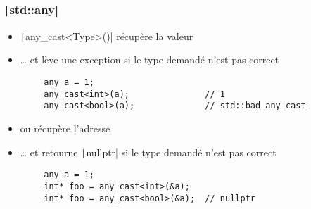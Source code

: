 \documentclass[C++.tex]{subfiles}
\begin{document}
\begin{frame}[fragile]
	\frametitle{\texttt|std::any|}
	\begin{itemize}
		\item \texttt|any_cast<Type>()| récupère la valeur
		\item \ldots{} et lève une exception si le type demandé n'est pas correct
	\end{itemize}

	\begin{verbatim}
		any a = 1;
		any_cast<int>(a);               // 1
		any_cast<bool>(a);              // std::bad_any_cast
	\end{verbatim}

	\begin{itemize}
		\item ou récupère l'adresse
		\item \ldots{} et retourne \texttt|nullptr| si le type demandé n'est pas correct
	\end{itemize}

	\begin{verbatim}
		any a = 1;
		int* foo = any_cast<int>(&a);
		int* foo = any_cast<bool>(&a);  // nullptr
	\end{verbatim}

\end{frame}
\end{document}

